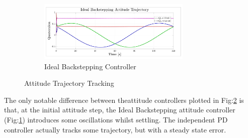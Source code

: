 \par
\begin{figure}[hbtp]\ContinuedFloat
\vspace{-6pt}
\begin{subfigure}{\textwidth}
\centering
\includegraphics[width=0.8\textwidth]{graphs/IBC_Trajectory}
\vspace{-11pt}
\caption{Ideal Backstepping Controller}
\label{fig:attitude-trajectory-ibc-tracking}
\end{subfigure}
\vspace{-8pt}
\caption{Attitude Trajectory Tracking}
\label{fig:attitude-trajectory-tracking}
\vspace{-14pt}
\end{figure}
The only notable difference between theattitude controllers
plotted in Fig:\ref{fig:attitude-trajectory-tracking} is that, at the initial attitude step, the Ideal Backstepping attitude controller (Fig:\ref{fig:attitude-trajectory-ibc-tracking}) introduces some oscillations whilst settling. The independent PD controller actually tracks some trajectory, but with a steady state error.
\par
